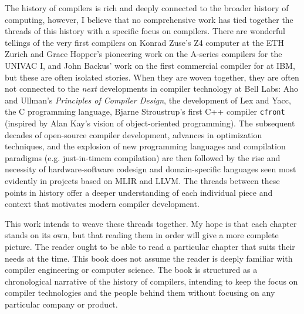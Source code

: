 
The history of compilers is rich and deeply connected to the broader history of computing,
however, I believe that no comprehensive work has tied together the threads of this history
with a specific focus on compilers.
There are wonderful tellings of the very first compilers on Konrad Zuse's Z4 computer at the ETH Zurich
and Grace Hopper's pioneering work on the A-series compilers for the UNIVAC I,
and John Backus' work on the first commercial compiler for \FTN{} at IBM,
but these are often isolated stories.
When they are woven together, they are often not connected to the
\textit{next} developments in compiler technology at Bell Labs:
Aho and Ullman's \textit{Principles of Compiler Design}, the development of Lex and Yacc,
the C programming language, Bjarne Stroustrup's first C++ compiler \texttt{cfront}
(inspired by Alan Kay's vision of object-oriented programming).
The subsequent decades of open-source compiler development, advances in optimization techniques,
and the explosion of new programming languages and compilation paradigms
(e.g. just-in-timem compilation) are then followed by the
rise and necessity of hardware-software codesign and domain-specific languages
seen most evidently in projects based on MLIR and LLVM.
The threads between these points in history offer a deeper understanding of
each individual piece and context that motivates modern compiler development.

This work intends to weave these threads together.
My hope is that each chapter stands on its own, but that reading them in order will give a more complete picture.
The reader ought to be able to read a particular chapter that suits their needs at the time.
This book does not assume the reader is deeply familiar with compiler engineering or computer science.
The book is structured as a chronological narrative of the history of compilers,
intending to keep the focus on compiler technologies and the people behind them
without focusing on any particular company or product.
